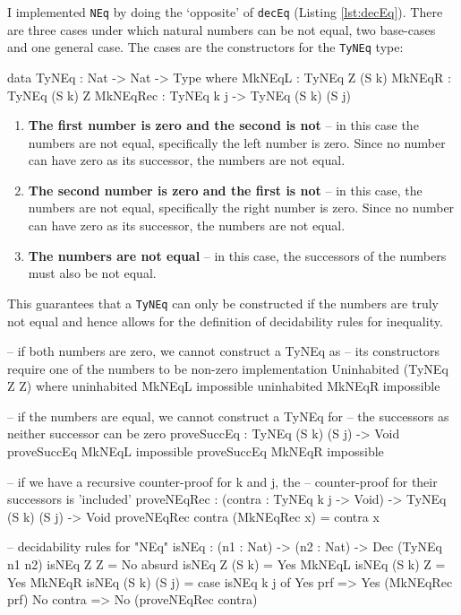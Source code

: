     I implemented \texttt{NEq} by doing the `opposite' of \texttt{decEq} (Listing \ref{lst:decEq}). There are three cases under which natural numbers can be not equal, two base-cases and one general case. The cases are the constructors for the \texttt{TyNEq} type:
    \begin{code}[caption={\texttt{TyNEq}} -- proving inequality.]
        data TyNEq : Nat -> Nat -> Type where
        MkNEqL   : TyNEq Z (S k)
        MkNEqR   : TyNEq (S k) Z
        MkNEqRec : TyNEq k j -> TyNEq (S k) (S j)
    \end{code}
    \begin{enumerate}
        \item \textbf{The first number is zero and the second is not} -- in this case the numbers are not equal, specifically the left number is zero. Since no number can have zero as its successor, the numbers are not equal.
        \item \textbf{The second number is zero and the first is not} -- in this case, the numbers are not equal, specifically the right number is zero. Since no number can have zero as its successor, the numbers are not equal.
        \item \textbf{The numbers are not equal} -- in this case, the successors of the numbers must also be not equal.
    \end{enumerate}
    This guarantees that a \texttt{TyNEq} can only be constructed if the numbers are truly not equal and hence allows for the definition of decidability rules for inequality.
    \begin{code}[caption={Decidability rules for inequality}]
    -- if both numbers are zero, we cannot construct a TyNEq as
    -- its constructors require one of the numbers to be non-zero
    implementation Uninhabited (TyNEq Z Z) where
        uninhabited MkNEqL impossible
        uninhabited MkNEqR impossible

    -- if the numbers are equal, we cannot construct a TyNEq for      
    -- the successors as neither successor can be zero
    proveSuccEq : TyNEq (S k) (S j) -> Void
    proveSuccEq MkNEqL impossible
    proveSuccEq MkNEqR impossible
    
    -- if we have a recursive counter-proof for k and j, the
    -- counter-proof for their successors is 'included'
    proveNEqRec : (contra : TyNEq k j -> Void) ->
                  TyNEq (S k) (S j) -> Void
    proveNEqRec contra (MkNEqRec x) = contra x
    
    -- decidability rules for "NEq"
    isNEq : (n1 : Nat) -> (n2 : Nat) -> Dec (TyNEq n1 n2)
    isNEq Z Z         = No absurd
    isNEq Z (S k)     = Yes MkNEqL
    isNEq (S k) Z     = Yes MkNEqR
    isNEq (S k) (S j) = case isNEq k j of
                            Yes prf => Yes (MkNEqRec prf)
                            No contra => No (proveNEqRec contra)
    \end{code}
    
